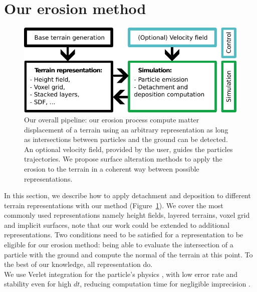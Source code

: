 \section{Our erosion method}
\label{sec:erosion_application_on_representations}
\begin{figure}[t]
    \centering
    \includegraphics{figures/figure_pipeline.pdf}
    \caption{Our overall pipeline: our erosion process compute matter displacement of a terrain using an arbitrary representation as long as intersections between particles and the ground can be detected. An optional velocity field, provided by the user, guides the particles trajectories. We propose surface alteration methods to apply the erosion to the terrain in a coherent way between possible representations. }
    \label{fig:erosion_figure_pipeline}
\end{figure}
In this section, we describe how to apply detachment and deposition to different terrain representations with our method (Figure~\ref{fig:erosion_figure_pipeline}). We cover the most commonly used representations namely height fields, layered terrains, voxel grid and implicit surfaces, note that our work could be extended to additional representations. Two conditions need to be satisfied for a representation to be eligible for our erosion method: being able to evaluate the intersection of a particle with the ground and compute the normal of the terrain at this point. To the best of our knowledge, all representation do. \\
We use Verlet integration for the particle's physics  \cite{Verlet1967}, with low error rate and stability even for high $dt$, reducing computation time for negligible imprecision \cite{Baraff1998, Swope1982}.

